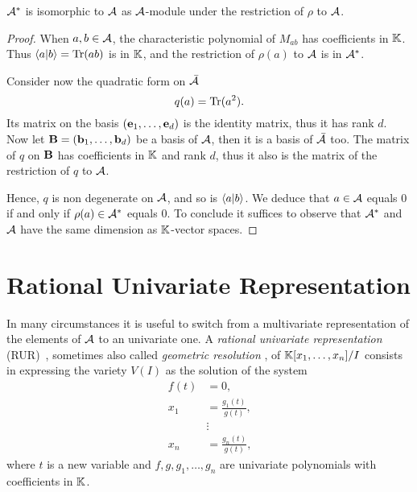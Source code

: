 \begin{theorem}
  $\mathcal{A}^\ast$ is isomorphic to $\mathcal{A}$ as
  $\mathcal{A}$-module under the restriction of $\rho$ to $\mathcal{A}$.
\end{theorem}
\begin{proof}
  When $a,b\in\mathcal{A}$, the characteristic polynomial of $M_{ab}$
  has coefficients in $\mathbb{K}$. Thus $\left\langle a \middle| b \right\rangle=\operatorname{Tr}(ab)$ is in $\mathbb{K}$,
  and the restriction of $\rho(a)$ to $\mathcal{A}$ is in
  $\mathcal{A}^\ast$.

  Consider now the quadratic form on $\bar{\mathcal{A}}$
  \begin{equation}
    \label{eq:113}
    q(a) = \operatorname{Tr}(a^2)
    \text{.}
  \end{equation}
  Its matrix on the basis $(\mathbf{e}_1,\ldots,\mathbf{e}_d)$ is the
  identity matrix, thus it has rank $d$. Now let
  $\mathbf{B}=(\mathbf{b}_1,\ldots,\mathbf{b}_d)$ be a basis of
  $\mathcal{A}$, then it is a basis of $\bar{\mathcal{A}}$ too. The
  matrix of $q$ on $\mathbf{B}$ has coefficients in $\mathbb{K}$ and rank $d$,
  thus it also is the matrix of the restriction of $q$ to $\mathcal{A}$.

  Hence, $q$ is non degenerate on $\mathcal{A}$, and so is
  $\left\langle a \middle| b \right\rangle$. We deduce that $a\in\mathcal{A}$ equals $0$ if and
  only if $\rho(a)\in\mathcal{A}^\ast$ equals $0$. To conclude it
  suffices to observe that $\mathcal{A}^\ast$ and $\mathcal{A}$ have the
  same dimension as $\mathbb{K}$-vector spaces.
\end{proof}


\section{Rational Univariate Representation}
\label{sec:rati-univ-repr}
In many circumstances it is useful to switch from a multivariate
representation of the elements of $\mathcal{A}$ to an univariate one. A
\emph{rational univariate representation} (RUR)~\cite{rouiller99},
sometimes also called \emph{geometric resolution}
\cite{giusti+lecerf+salvy01}, of $\mathbb{K}[x_1,\ldots,x_n]/I$ consists in
expressing the variety $V(I)$ as the solution of the system
\begin{equation}
  \label{eq:22}
  \begin{aligned}
    f(t) &= 0\text{,}\\
    x_1 &= \frac{g_1(t)}{g(t)}\text{,}\\
    &\vdots\\
    x_n &= \frac{g_n(t)}{g(t)}\text{,}    
  \end{aligned}
\end{equation}
where $t$ is a new variable and $f,g,g_1,\ldots,g_n$ are univariate
polynomials with coefficients in $\mathbb{K}$.


